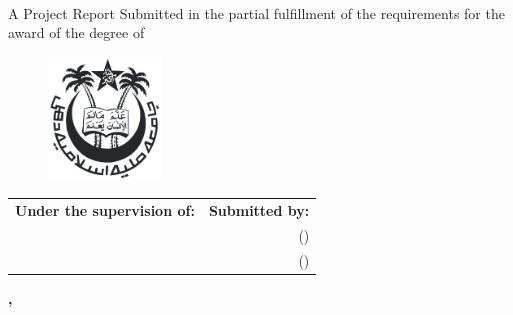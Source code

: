 \begin{titlepage}
    \begin{center}
        \begin{chaptersize}
            \textbf{\projectTitle{}}\\[\baselineskip]
        \end{chaptersize}
        \begin{sectionsize}
            A Project Report\linebreak
            Submitted in the partial fulfillment of the requirements for the
            award of the degree of\\[\baselineskip]
        \end{sectionsize}
        \begin{chaptersize}
            \textbf{\degreeName{}}
        \end{chaptersize}

        \vspace{20mm}
        \begin{figure}[H]
            \centering
            \includegraphics[width=30mm]{img/jmi.png}
        \end{figure}
        \vspace{20mm}

        \begin{sectionsize}
            \begin{center}
                \begin{tabularx}{\textwidth}{L R}
                    \textbf{Under the supervision of:} & \textbf{Submitted by:}\\
                    \mentorName{}                      & \authorAshhar{} (\authorAshharRoll{})\\
                    \mentorJobTitle{}                  & \authorAdeela{} (\authorAdeelaRoll{})
                \end{tabularx}
            \end{center}

            \vfill

            \textbf{%
                \departmentName{}\linebreak
                \facultyName{}\linebreak
                \collegeName{}, \cityNamePin{}
            }
        \end{sectionsize}
    \end{center}
\end{titlepage}
